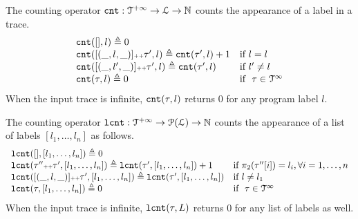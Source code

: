 \begin{defn}
 \label{def:counter}
The counting operator $\mathtt{cnt} : \mathcal{T}^{+\infty} \to \mathcal{L} \to \mathbb{N}$
counts the appearance of a label in a trace.
\[
\begin{array}{ll}
 \mathtt{cnt}({[]}, l) \triangleq 0 
 \\
 \mathtt{cnt}([(\_, l, \_)] {\scriptscriptstyle ++} \mathtt{\tau}', l ) \triangleq \mathtt{cnt}(\mathtt{\tau}', l) + 1 & \text{if}~ l = l
 \\
 \mathtt{cnt}([(\_, l', \_)] {\scriptscriptstyle ++} \mathtt{\tau}', l) \triangleq \mathtt{cnt}(\mathtt{\tau}', l) & \text{if}~ l' \neq l
 \\
 \mathtt{cnt}(\mathtt{\tau}, l) \triangleq 0 & \text{if }~ \mathtt{\tau} \in \mathcal{T}^{\infty}
\end{array}
\]{When the input trace is infinite, $\mathtt{cnt}(\mathtt{\tau}, l)$ returns $0$ for any program label $l$.}
\end{defn}
\begin{defn}
 \label{def:lcounter}
 The counting operator $\mathtt{lcnt} : \mathcal{T}^{+\infty} \to \mathcal{P}(\mathcal{L}) \to \mathbb{N}$
 counts the appearance of a list of labels $[l_1, \ldots, l_n]$ as follows.
\[
 \begin{array}{ll}
\mathtt{lcnt}([], [l_1, \ldots, l_n] ) 
\triangleq 0 & 
\\ 
\mathtt{lcnt}(\mathtt{\tau}'' {\scriptscriptstyle ++} \mathtt{\tau}', [l_1, \ldots, l_n] ) 
 \triangleq \mathtt{lcnt}(\mathtt{\tau}', [l_1, \ldots, l_n]) + 1 & \text{if}~ \pi_2(\mathtt{\tau}''[i]) = l_i, \forall i = 1, \ldots, n
 \\ 
 \mathtt{lcnt}([(\_, l, \_)] {\scriptscriptstyle ++} \mathtt{\tau}', [l_1, \ldots, l_n] ) 
 \triangleq \mathtt{lcnt}(\mathtt{\tau}', [l_1, \ldots, l_n]) & \text{if}~ l \neq l_1
 \\ 
 \mathtt{lcnt}(\mathtt{\tau}, [l_1, \ldots, l_n] ) 
 \triangleq 0 & \text{if }~ \mathtt{\tau} \in \mathcal{T}^{\infty}
\end{array}
\]
{When the input trace is infinite, $\mathtt{lcnt}(\mathtt{\tau}, L)$ returns $0$ for any list of labels as well.}
\end{defn}
